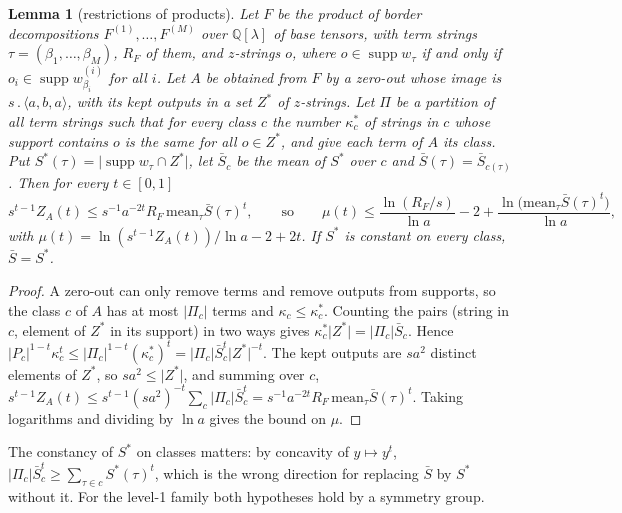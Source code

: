 \documentclass[11pt]{article}
\newtheorem{lemma}[theorem]{Lemma}
\theoremstyle{definition}
\theoremstyle{remark}
\providecommand{\Q}{\mathbb{Q}}
\newcommand{\abs}[1]{\lvert #1\rvert}
\DeclareMathOperator{\supp}{supp}
\newcommand{\mat}[3]{\langle #1,#2,#3\rangle} %
\newcommand{\cp}{\mathbin{.}}                 %
\begin{document}
\begin{lemma}[restrictions of products]\label{cp:L6:lemma5}
Let $F$ be the product of border decompositions $F^{(1)},\dots,F^{(M)}$ over $\Q[\lambda]$ of base tensors, with term strings $\tau=(\beta_1,\dots,\beta_M)$, $R_F$ of them, and $z$-strings $o$, where $o\in\supp w_\tau$ if and only if $o_i\in\supp w^{(i)}_{\beta_i}$ for all $i$. Let $A$ be obtained from $F$ by a zero-out whose image is $s\cp\mat aba$, with its kept outputs in a set $Z^*$ of $z$-strings. Let $\Pi$ be a partition of all term strings such that for every class $c$ the number $\kappa^*_c$ of strings in $c$ whose support contains $o$ is the same for all $o\in Z^*$, and give each term of $A$ its class. Put $S^*(\tau)=\abs{\supp w_\tau\cap Z^*}$, let $\bar S_c$ be the mean of $S^*$ over $c$ and $\bar S(\tau)=\bar S_{c(\tau)}$. Then for every $t\in[0,1]$
\[
s^{t-1}Z_A(t)\le s^{-1}a^{-2t}R_F\,\mathrm{mean}_\tau\bar S(\tau)^t,\qquad\text{so}\qquad\mu(t)\le\frac{\ln(R_F/s)}{\ln a}-2+\frac{\ln\bigl(\mathrm{mean}_\tau\bar S(\tau)^t\bigr)}{\ln a},
\]
with $\mu(t)=\ln(s^{t-1}Z_A(t))/\ln a-2+2t$. If $S^*$ is constant on every class, $\bar S=S^*$.
\end{lemma}

\begin{proof}
A zero-out can only remove terms and remove outputs from supports, so the class $c$ of $A$ has at most $\abs{\Pi_c}$ terms and $\kappa_c\le\kappa^*_c$. Counting the pairs (string in $c$, element of $Z^*$ in its support) in two ways gives $\kappa^*_c\abs{Z^*}=\abs{\Pi_c}\bar S_c$. Hence $\abs{P_c}^{1-t}\kappa_c^t\le\abs{\Pi_c}^{1-t}(\kappa^*_c)^t=\abs{\Pi_c}\bar S_c^t\abs{Z^*}^{-t}$. The kept outputs are $sa^2$ distinct elements of $Z^*$, so $sa^2\le\abs{Z^*}$, and summing over $c$, $s^{t-1}Z_A(t)\le s^{t-1}(sa^2)^{-t}\sum_c\abs{\Pi_c}\bar S_c^t=s^{-1}a^{-2t}R_F\,\mathrm{mean}_\tau\bar S(\tau)^t$. Taking logarithms and dividing by $\ln a$ gives the bound on $\mu$.
\end{proof}

The constancy of $S^*$ on classes matters: by concavity of $y\mapsto y^t$, $\abs{\Pi_c}\bar S_c^t\ge\sum_{\tau\in c}S^*(\tau)^t$, which is the wrong direction for replacing $\bar S$ by $S^*$ without it. For the level-1 family both hypotheses hold by a symmetry group.
\end{document}

